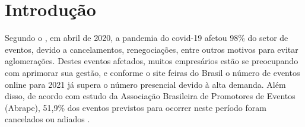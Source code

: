 \chapter{Introdução}
\label{chp:LABEL_CHP_1}


Segundo o , em abril de 2020, a pandemia do covid-19 afetou 98\% do setor de eventos, devido a cancelamentos, renegociações, entre outros motivos para evitar aglomerações. Destes eventos afetados, muitos empresários estão se preocupando com aprimorar sua gestão, e conforme o site feiras do Brasil o número de eventos online para 2021 já supera o número presencial devido à alta demanda. Além disso, de acordo com estudo da Associação Brasileira de Promotores de Eventos (Abrape), 51,9\% dos eventos previstos para ocorrer neste período foram cancelados ou adiados \cite{FEIRA}.

